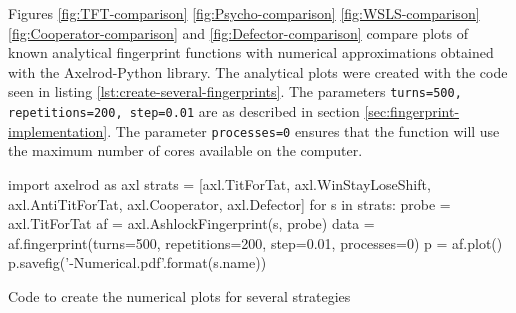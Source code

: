 Figures \ref{fig:TFT-comparison} \ref{fig:Psycho-comparison}
\ref{fig:WSLS-comparison} \ref{fig:Cooperator-comparison} and \ref{fig:Defector-comparison} compare plots of known analytical fingerprint functions with numerical approximations obtained with the Axelrod-Python library.
The analytical plots were created with the code seen in listing \ref{lst:create-several-fingerprints}.
The parameters \texttt{turns=500, repetitions=200, step=0.01} are as described in section \ref{sec:fingerprint-implementation}.
The parameter \texttt{processes=0} ensures that the function will use the maximum number of cores available on the computer.

\begin{listing}[hbtp!]
\begin{ExampleCode}
import axelrod as axl
strats = [axl.TitForTat, axl.WinStayLoseShift, axl.AntiTitForTat,
          axl.Cooperator, axl.Defector]
for s in strats:
    probe = axl.TitForTat
    af = axl.AshlockFingerprint(s, probe)
    data = af.fingerprint(turns=500, repetitions=200, step=0.01, processes=0)
    p = af.plot()
    p.savefig('{}-Numerical.pdf'.format(s.name))
\end{ExampleCode}
\caption{Code to create the numerical plots for several strategies}
\label{lst:create-several-fingerprints}
\end{listing}


